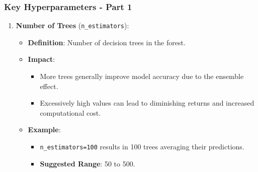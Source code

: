 \documentclass[aspectratio=169]{beamer}
\begin{document}
\begin{frame}[fragile]
    \frametitle{Key Hyperparameters - Part 1}
    \begin{enumerate}
        \item \textbf{Number of Trees} (\texttt{n\_estimators}):
        \begin{itemize}
            \item \textbf{Definition}: Number of decision trees in the forest.
            \item \textbf{Impact}:
            \begin{itemize}
                \item More trees generally improve model accuracy due to the ensemble effect.
                \item Excessively high values can lead to diminishing returns and increased computational cost.
            \end{itemize}
            \item \textbf{Example}: 
            \begin{itemize}
                \item \texttt{n\_estimators=100} results in 100 trees averaging their predictions.
                \item \textbf{Suggested Range}: 50 to 500.
            \end{itemize}
        \end{itemize}
        
    \end{enumerate}
\end{frame}
\end{document}
